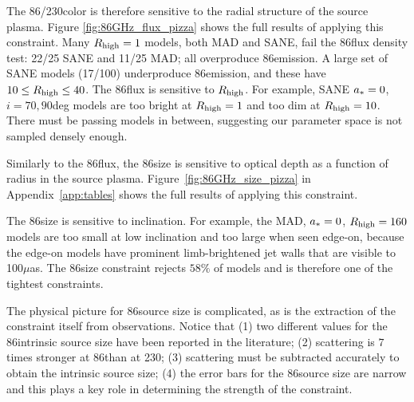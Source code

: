 The 86\GHz/230\GHz color is therefore sensitive to the radial structure of the source plasma.  Figure \ref{fig:86GHz_flux_pizza} shows the full results of applying this constraint.
Many $R_\mathrm{high} = 1$ models, both MAD and SANE, fail the 86\GHz flux density test: 22/25 SANE and 11/25 MAD; all overproduce 86\GHz emission.  A large set of SANE models (17/100) underproduce 86\GHz emission, and these have $10 \le R_\mathrm{high} \le 40$.
The 86\GHz flux is sensitive to $R_\mathrm{high}$.  For example, SANE $a_* = 0$, $i = 70,90$deg models are too bright at $R_\mathrm{high} = 1$ and too dim at $R_\mathrm{high} = 10$.  There must be passing models in between, suggesting our parameter space is not sampled densely enough.



Similarly to the 86\GHz flux, the 86\GHz size is sensitive to optical depth as a function of radius in the source plasma. Figure~\ref{fig:86GHz_size_pizza} in Appendix~\ref{app:tables} shows the full results of applying this constraint.


The 86\GHz size is sensitive to inclination.  For example, the MAD, $a_* = 0$, $R_\mathrm{high} = 160$ models are too small at low inclination and too large when seen edge-on, because the edge-on models have prominent limb-brightened jet walls that are visible to 100$\mu$as.  The 86\GHz size constraint rejects
$58\%$ of models and is therefore one of the tightest constraints.

The physical picture for 86\GHz source size is complicated, as is the extraction of the constraint itself from observations.  Notice that (1) two different values for the 86\GHz intrinsic source size have been reported in the literature; (2) scattering is $7$ times stronger at 86\GHz than at 230\GHz; (3) scattering must be subtracted accurately to obtain the intrinsic source size; (4) the error bars for the 86\GHz source size are narrow and this plays a key role in determining the strength of the constraint.


